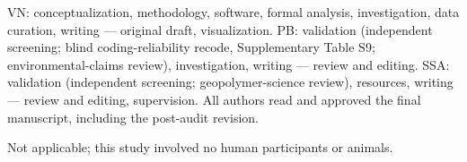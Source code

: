 \documentclass[pdflatex,sn-basic]{sn-jnl}
\begin{document}
VN: conceptualization, methodology, software, formal analysis, investigation, data curation, writing --- original draft, visualization. PB: validation (independent screening; blind coding-reliability recode, Supplementary Table S9; environmental-claims review), investigation, writing --- review and editing. SSA: validation (independent screening; geopolymer-science review), resources, writing --- review and editing, supervision. All authors read and approved the final manuscript, including the post-audit revision.

Not applicable; this study involved no human participants or animals.


\end{document}
